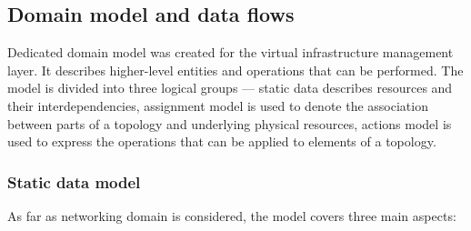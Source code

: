 \documentclass[11pt,openany]{book}
\begin{document}
      \subsection{Domain model and data flows}
      \label{sec:domain-model}

        Dedicated domain model was created for the virtual infrastructure management layer. It describes higher-level
        entities and operations that can be performed. The model is divided into three logical groups --- static data
        describes resources and their interdependencies, assignment model is used to denote the association between
        parts of a topology and underlying physical resources, actions model is used to express the operations that can
        be applied to elements of a topology.


        \subsubsection{Static data model}

          As far as networking domain is considered, the model covers three main aspects:
\end{document}
